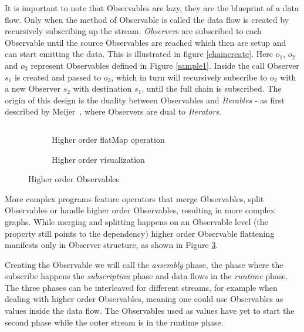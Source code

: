 It is important to note that Observables are lazy, they are the blueprint of a data flow. Only when the  method of Observable is called the data flow is created by recursively subscribing up the stream. \textit{Observer}s are subscribed to each Observable until the source Observables are reached which then are setup and can start emitting the data.
This is illustrated in figure \ref{chaincreate}. Here $o_1$, $o_2$ and $o_3$ represent Observables defined in Figure \ref{sample1}. Inside the  call Observer $s_1$ is created and passed to $o_3$, which in turn will recursively subscribe to $o_2$ with a new Observer $s_2$ with destination $s_1$, until the full chain is subscribed.
The origin of this design is the duality between Observables and \textit{Iterables} - as first described by Meijer~\cite{meijer2010subject}, where Observers are dual to \textit{Iterators}.

\begin{figure}

\begin{subfigure}[a]{\columnwidth}
\inputminted[tabsize=2]{javascript}{listings/sample3.js}	
\caption{Higher order flatMap operation}
\label{sample3}
\end{subfigure}

\begin{subfigure}[b]{\columnwidth}
\centering

\caption{Higher order visualization}
\label{chainhigher}
\end{subfigure}

\caption{Higher order Observables}

\end{figure}

More complex programs feature operators that merge Observables, split Observables or handle higher order Observables, resulting in more complex graphs. While merging and splitting happens on an Observable level (the  property still points to the dependency) higher order Observable flattening manifests only in Observer structure, as shown in Figure \ref{chainhigher}.

Creating the Observable we will call the \textit{assembly} phase, the phase where the subscribe happens the \textit{subscription} phase and data flows in the \textit{runtime} phase. The three phases can be interleaved for different streams, for example when dealing with higher order Observables,  meaning one could use Observables as values inside the data flow. The Observables used as values have yet to start the second phase while the outer stream is in the runtime phase.
